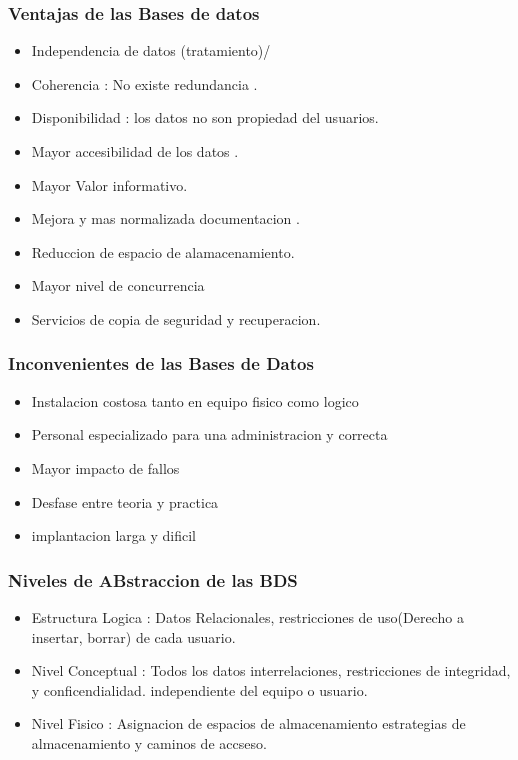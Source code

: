 \documentclass{article}
\begin{document}
\begin{multicols}{2}
        \subsubsection{Ventajas de las Bases de datos}
        \begin{itemize}
            \item Independencia de datos (tratamiento)/
            \item Coherencia : No existe redundancia .
            \item Disponibilidad : los datos no son propiedad del usuarios.
            \item Mayor accesibilidad de los datos .
            \item Mayor Valor informativo.
            \item Mejora y mas normalizada documentacion .
            \item Reduccion de espacio de alamacenamiento.
            \item Mayor nivel de concurrencia
            \item Servicios de copia de seguridad y recuperacion.
        \end{itemize}

        \subsubsection{Inconvenientes de las Bases de Datos}
        \begin{itemize}
            \item Instalacion costosa tanto en equipo fisico como logico
            \item Personal especializado para una administracion y correcta
            \item Mayor impacto de fallos
            \item Desfase entre teoria y practica
            \item implantacion larga y dificil
        \end{itemize}
        \subsubsection{Niveles de ABstraccion de las BDS}
        \begin{itemize}
            \item Estructura Logica : Datos Relacionales, restricciones de uso(Derecho a insertar, borrar) de cada usuario.
            \item Nivel Conceptual : Todos los datos interrelaciones, restricciones de integridad, y conficendialidad. independiente del equipo o usuario.
            \item Nivel Fisico : Asignacion de espacios de almacenamiento estrategias de almacenamiento y caminos de accseso.
         \end{itemize}


\end{multicols}
\end{document}
